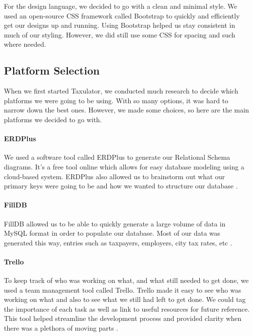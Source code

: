\documentclass[sigconf]{acmart}
\begin{document}
For the design language, we decided to go with a clean and minimal style. We used an open-source CSS framework called Bootstrap \cite{Bootstrap} to quickly and efficiently get our designs up and running. Using Bootstrap helped us stay consistent in much of our styling. However, we did still use some CSS for spacing and such where needed.

\subsection{Platform Selection}
When we first started Taxulator, we conducted much research to decide which platforms we were going to be using. With so many options, it was hard to narrow down the best ones. However, we made some choices, so here are the main platforms we decided to go with.

\paragraph{ERDPlus}
We used a software tool called ERDPlus to generate our Relational Schema diagrams. It’s a free tool online which allows for easy database modeling using a cloud-based system. ERDPlus also allowed us to brainstorm out what our primary keys were going to be and how we wanted to structure our database \cite{ERDPlus}.

\paragraph{FillDB}
FillDB allowed us to be able to quickly generate a large volume of data in MySQL format in order to populate our database. Most of our data was generated this way, entries such as taxpayers, employers, city tax rates, etc \cite{FillDB}.

\paragraph{Trello}
To keep track of who was working on what, and what still needed to get done, we used a team management tool called Trello. Trello made it easy to see who was working on what and also to see what we still had left to get done. We could tag the importance of each task as well as link to useful resources for future reference. This tool helped streamline the development process and provided clarity when there was a plethora of moving parts \cite{Trello}.
\end{document}
